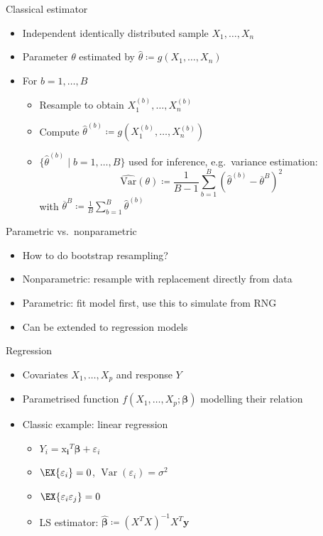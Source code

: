 \documentclass[tikz]{beamer}
\begin{document}
\begin{frame}{Classical estimator}
  \begin{itemize}
    \item Independent identically distributed sample $X_1, \dots, X_n$
    \item Parameter $\theta$ estimated by $\widehat{\theta} \coloneqq g(X_1, \dots, X_n)$
    \item For $b = 1, \dots, B$
          \begin{itemize}
            \item Resample to obtain $X_1^{(b)}, \dots, X_n^{(b)}$
            \item Compute $\widehat{\theta}^{(b)} \coloneqq g(X_1^{(b)}, \dots, X_n^{(b)})$
            \item $\{ \widehat{\theta}^{(b)} \mid b = 1, \dots, B \}$ used for inference, e.g.\ variance estimation:
                  \begin{equation*}
                    \widehat{\mathrm{Var}}(\theta) \coloneqq \frac{1}{B - 1} \sum_{b = 1}^B (\widehat{\theta}^{(b)} - \overline{\theta}^{B})^2
                  \end{equation*}
                  with $\overline{\theta}^{B} \coloneqq \frac{1}{B} \sum_{b = 1}^B \widehat{\theta}^{(b)}$
          \end{itemize}
  \end{itemize}
\end{frame}

\begin{frame}{Parametric vs.\ nonparametric}
  \begin{itemize}
    \item How to do bootstrap resampling?
    \item Nonparametric: resample with replacement directly from data
    \item Parametric: fit model first, use this to simulate from RNG
    \item Can be extended to regression models
  \end{itemize}
\end{frame}

\begin{frame}{Regression}
  \begin{itemize}
    \item Covariates $X_1, \dots, X_p$ and response $Y$
    \item Parametrised function $f(X_1, \dots, X_p; \bm{\beta})$ modelling their relation
    \item Classic example: linear regression
          \begin{itemize}
            \item $Y_i = \bm{\mathrm{x}_i}^T \bm{\beta} + \varepsilon_i$
            \item $\EX{\varepsilon_i} = 0$, $\operatorname{Var}(\varepsilon_i) = \sigma^2$
            \item $\EX{\varepsilon_i \varepsilon_j} = 0$
            \item LS estimator: $\widehat{\bm{\beta}} \coloneqq (X^T X)^{-1} X^T \mathbf{y}$
          \end{itemize}
  \end{itemize}
\end{frame}
\end{document}
